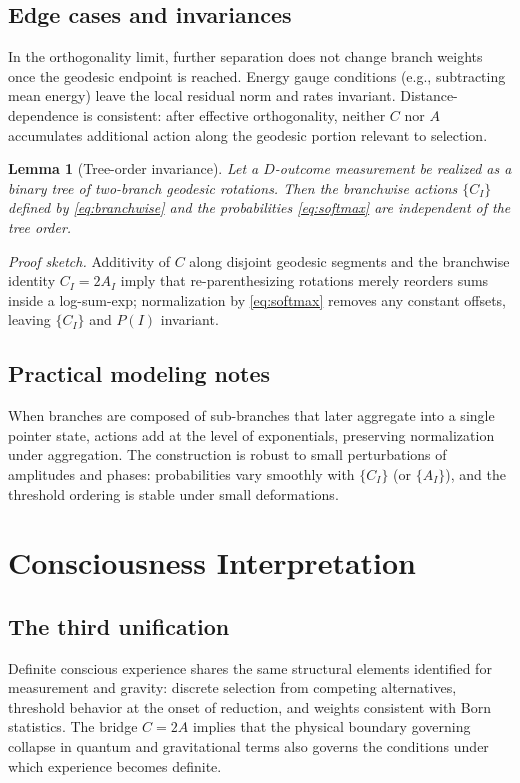 \documentclass[reprint,aps,prd,nofootinbib]{revtex4-2}
\newtheorem{lemma}{Lemma}
\begin{document}
\subsection{Edge cases and invariances}
In the orthogonality limit, further separation does not change branch weights once the geodesic endpoint is reached. Energy gauge conditions (e.g., subtracting mean energy) leave the local residual norm and rates invariant. Distance-dependence is consistent: after effective orthogonality, neither $C$ nor $A$ accumulates additional action along the geodesic portion relevant to selection.
\begin{lemma}[Tree-order invariance]\label{lem:tree}
Let a $D$-outcome measurement be realized as a binary tree of two-branch geodesic rotations. Then the branchwise actions $\{C_I\}$ defined by \eqref{eq:branchwise} and the probabilities \eqref{eq:softmax} are independent of the tree order.
\end{lemma}
\noindent\emph{Proof sketch.} Additivity of $C$ along disjoint geodesic segments and the branchwise identity $C_I=2A_I$ imply that re-parenthesizing rotations merely reorders sums inside a log-sum-exp; normalization by \eqref{eq:softmax} removes any constant offsets, leaving $\{C_I\}$ and $P(I)$ invariant.

\subsection{Practical modeling notes}
When branches are composed of sub-branches that later aggregate into a single pointer state, actions add at the level of exponentials, preserving normalization under aggregation. The construction is robust to small perturbations of amplitudes and phases: probabilities vary smoothly with $\{C_I\}$ (or $\{A_I\}$), and the threshold ordering is stable under small deformations.

\section{Consciousness Interpretation}
\label{sec:consciousness}

\subsection{The third unification}
Definite conscious experience shares the same structural elements identified for measurement and gravity: discrete selection from competing alternatives, threshold behavior at the onset of reduction, and weights consistent with Born statistics. The bridge $C=2A$ implies that the physical boundary governing collapse in quantum and gravitational terms also governs the conditions under which experience becomes definite.
\end{document}
